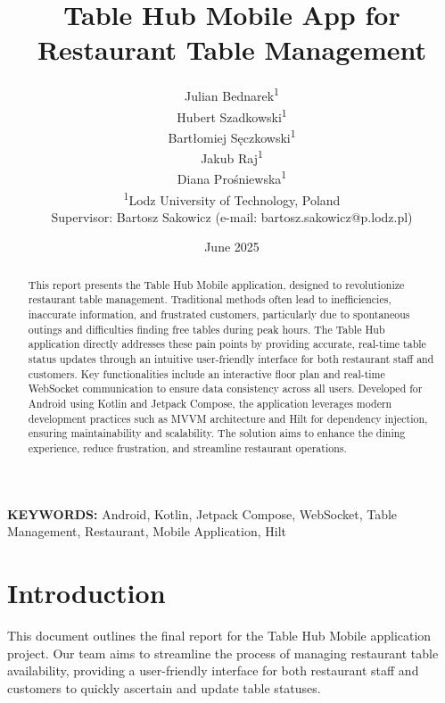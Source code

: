 \documentclass{article}
\makeatletter
\newcommand{\firstauthorname}{Julian Bednarek}
\newcommand{\secondauthorname}{Hubert Szadkowski}
\newcommand{\thirdauthorname}{Bartłomiej Sęczkowski}
\newcommand{\fourthauthorname}{Jakub Raj}
\newcommand{\fifthauthorname}{Diana Prośniewska}
\newcommand{\universityname}{Lodz University of Technology, Poland}
\newcommand{\supervisorname}{Bartosz Sakowicz}
\newcommand{\supervisoremail}{bartosz.sakowicz@p.lodz.pl}
\newcommand{\projecttitle}{Table Hub Mobile App for Restaurant Table Management}
\makeatother
\begin{document}
\title{\projecttitle}
\author{
    \firstauthorname\textsuperscript{1}\\
    \secondauthorname\textsuperscript{1}\\
    \thirdauthorname\textsuperscript{1}\\
    \fourthauthorname\textsuperscript{1}\\
    \fifthauthorname\textsuperscript{1}\\[1ex]
    \textsuperscript{1}\universityname\\[1ex]
    Supervisor: \supervisorname{} (e-mail: \supervisoremail)
}
\date{June 2025}

\maketitle

\begin{abstract}
This report presents the Table Hub Mobile application, designed to revolutionize restaurant table management. Traditional methods often lead to inefficiencies, inaccurate information, and frustrated customers, particularly due to spontaneous outings and difficulties finding free tables during peak hours. The Table Hub application directly addresses these pain points by providing accurate, real-time table status updates through an intuitive user-friendly interface for both restaurant staff and customers. Key functionalities include an interactive floor plan and real-time WebSocket communication to ensure data consistency across all users. Developed for Android using Kotlin and Jetpack Compose, the application leverages modern development practices such as MVVM architecture and Hilt for dependency injection, ensuring maintainability and scalability. The solution aims to enhance the dining experience, reduce frustration, and streamline restaurant operations.
\end{abstract}

\noindent\textbf{KEYWORDS:} Android, Kotlin, Jetpack Compose, WebSocket, Table Management, Restaurant, Mobile Application, Hilt

\section{Introduction}
This document outlines the final report for the Table Hub Mobile application project. Our team aims to streamline the process of managing restaurant table availability, providing a user-friendly interface for both restaurant staff and customers to quickly ascertain and update table statuses.
\end{document}
